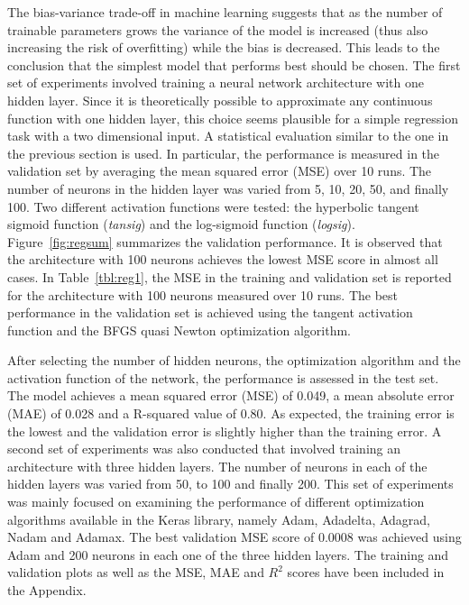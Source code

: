 \documentclass[conference,compsoc]{IEEEtran}
\begin{document}
The bias-variance trade-off in machine learning suggests that as the number of trainable parameters grows the variance of the model is increased (thus also increasing the risk of overfitting) while the bias is decreased. This leads to the conclusion that the simplest model that performs best should be chosen. The first set of experiments involved training a neural network architecture with one hidden layer. Since it is theoretically possible to approximate any continuous function with one hidden layer, this choice seems plausible for a simple regression task with a two dimensional input. A statistical evaluation similar to the one in the previous section is used. In particular, the performance is measured in the validation set by averaging the mean squared error (MSE) over 10 runs. The number of neurons in the hidden layer was varied from 5, 10, 20, 50, and finally 100. Two different activation functions were tested: the hyperbolic tangent sigmoid function (\textit{tansig}) and the log-sigmoid function (\textit{logsig}). Figure~\ref{fig:regsum} summarizes the validation performance. It is observed that the architecture with 100 neurons achieves the lowest MSE score in almost all cases. In Table~\ref{tbl:reg1}, the MSE in the training and validation set is reported for the architecture with 100 neurons measured over 10 runs. The best performance in the validation set is achieved using the tangent activation function and the BFGS quasi Newton optimization algorithm. 





After selecting the number of hidden neurons, the optimization algorithm and the activation function of the network, the performance is assessed in the test set. The model achieves a mean squared error (MSE) of 0.049, a mean absolute error (MAE) of 0.028 and a R-squared value of 0.80. As expected, the training error is the lowest and the validation error is slightly higher than the training error. A second set of experiments was also conducted that involved training an architecture with three hidden layers. The number of neurons in each of the hidden layers was varied from 50, to 100 and finally 200. This set of experiments was mainly focused on examining the performance of different optimization algorithms available in the Keras library, namely Adam, Adadelta, Adagrad, Nadam and Adamax. The best validation MSE score of 0.0008 was achieved using Adam and 200 neurons in each one of the three hidden layers. The training and validation plots as well as the MSE, MAE and $R^2$ scores have been included in the Appendix.
\end{document}
